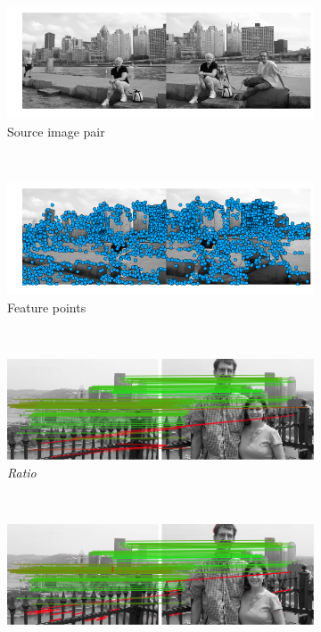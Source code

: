 \begin{figure}
	\centering%
		\begin{subfigure}[t]{\columnwidth}
			\centering
			\includegraphics[width=0.85\columnwidth]{images/MMC_pitts_source}
			\caption{Source image pair}
			\label{fig:pitts_source}
		\end{subfigure}%
		\\ %
		\begin{subfigure}[t]{\columnwidth}
			\centering
			\includegraphics[width=0.85\columnwidth]{images/MMC_pitts_keypoints}
			\caption{Feature points}
			\label{fig:pitts_keypoints}
		\end{subfigure}%
		\\ %
		\begin{subfigure}[t]{\columnwidth}
			\centering
			\includegraphics[width=0.85\columnwidth]{images/mirror_match_off}
			\caption{\emph{Ratio}}
			\label{fig:unique}
		\end{subfigure}%
		\\ %
		\begin{subfigure}[t]{\columnwidth}
			\centering
			\includegraphics[width=0.85\columnwidth]{images/mirror_match_with_pruned}

\end{subfigure}
\end{figure}
